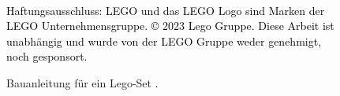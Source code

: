 \begin{figure}[!htb]
    \centering
        {%
        \textcolor{black}{%
            Haftungsausschluss: LEGO \textsuperscript{\textregistered{}} und das LEGO Logo sind Marken der LEGO Unternehmensgruppe. 
            \newline
            \copyright{} 2023 Lego Gruppe. Diese Arbeit ist unabhängig und wurde von der LEGO Gruppe weder genehmigt, noch gesponsort.
        }
    }
    \caption{Bauanleitung für ein Lego-Set \cite{lego-easter-chick}.}
    \label{sec1:intro:subsec:problems:fig:lego-instructions}
\end{figure}